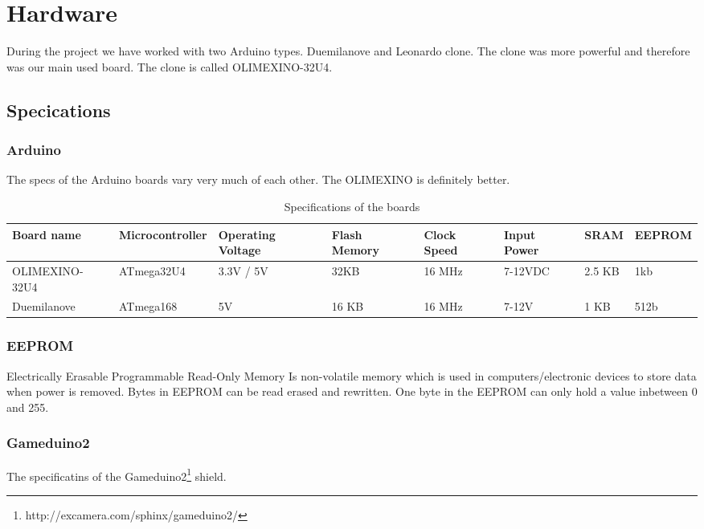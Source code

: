 \chapter{Hardware} %

During the project we have worked with two Arduino types. Duemilanove and Leonardo clone.
The clone was more powerful and therefore was our main used board. The clone is called
OLIMEXINO-32U4.
\section{Specications}

\subsection*{Arduino}
The specs of the Arduino boards vary very much of each other. The OLIMEXINO is definitely
better.

\begin{table}[h]
\resizebox{16cm}{!} {
    \begin{tabular}{l|l|l|l|l|l|l|l}
    Board name     & Microcontroller & Operating Voltage & Flash Memory & Clock Speed & Input Power & SRAM & EEPROM  \\ \hline
    OLIMEXINO-32U4 & ATmega32U4      & 3.3V / 5V         & 32KB         & 16 MHz      & 7-12VDC     & 2.5 KB & 1kb \\
    Duemilanove    & ATmega168       & 5V                & 16 KB        & 16 MHz      & 7-12V       & 1 KB& 512b   \\
    \end{tabular}
}
    \caption{Specifications of the boards}
\end{table}
\subsection*{EEPROM}
Electrically Erasable Programmable Read-Only Memory Is non-volatile memory which is used in computers/electronic devices to store data when power is removed. Bytes in EEPROM can be read erased and rewritten. One byte in the EEPROM can only hold a value inbetween 0 and 255.

\newpage
\subsection*{Gameduino2}
The specificatins of the Gameduino2\footnote{http://excamera.com/sphinx/gameduino2/} shield.

